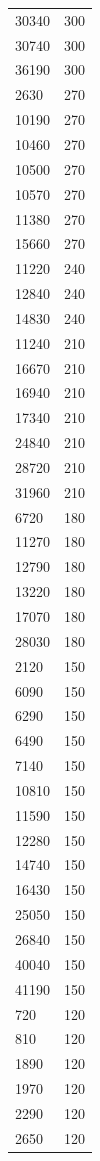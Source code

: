 \begin{table}[ht]
\begin{tabular}{lr}
  30340 & 300 \\ 
  30740 & 300 \\ 
  36190 & 300 \\ 
  2630 & 270 \\ 
  10190 & 270 \\ 
  10460 & 270 \\ 
  10500 & 270 \\ 
  10570 & 270 \\ 
  11380 & 270 \\ 
  15660 & 270 \\ 
  11220 & 240 \\ 
  12840 & 240 \\ 
  14830 & 240 \\ 
  11240 & 210 \\ 
  16670 & 210 \\ 
  16940 & 210 \\ 
  17340 & 210 \\ 
  24840 & 210 \\ 
  28720 & 210 \\ 
  31960 & 210 \\ 
  6720 & 180 \\ 
  11270 & 180 \\ 
  12790 & 180 \\ 
  13220 & 180 \\ 
  17070 & 180 \\ 
  28030 & 180 \\ 
  2120 & 150 \\ 
  6090 & 150 \\ 
  6290 & 150 \\ 
  6490 & 150 \\ 
  7140 & 150 \\ 
  10810 & 150 \\ 
  11590 & 150 \\ 
  12280 & 150 \\ 
  14740 & 150 \\ 
  16430 & 150 \\ 
  25050 & 150 \\ 
  26840 & 150 \\ 
  40040 & 150 \\ 
  41190 & 150 \\ 
  720 & 120 \\ 
  810 & 120 \\ 
  1890 & 120 \\ 
  1970 & 120 \\ 
  2290 & 120 \\ 
  2650 & 120 \\ 

\end{tabular}
\end{table}
